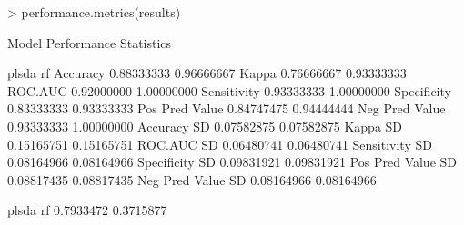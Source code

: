 \documentclass[12pt]{article}
\renewenvironment{Schunk}{\vspace{\topsep}}{\vspace{\topsep}}
\begin{document}
\begin{Schunk}
\begin{Sinput}
> performance.metrics(results)
\end{Sinput}
\begin{Soutput}
Model Performance Statistics

                       plsda         rf
Accuracy          0.88333333 0.96666667
Kappa             0.76666667 0.93333333
ROC.AUC           0.92000000 1.00000000
Sensitivity       0.93333333 1.00000000
Specificity       0.83333333 0.93333333
Pos Pred Value    0.84747475 0.94444444
Neg Pred Value    0.93333333 1.00000000
Accuracy SD       0.07582875 0.07582875
Kappa SD          0.15165751 0.15165751
ROC.AUC SD        0.06480741 0.06480741
Sensitivity SD    0.08164966 0.08164966
Specificity SD    0.09831921 0.09831921
Pos Pred Value SD 0.08817435 0.08817435
Neg Pred Value SD 0.08164966 0.08164966
\end{Soutput}
\begin{Soutput}
    plsda        rf 
0.7933472 0.3715877 
\end{Soutput}
\end{Schunk}
\end{document}
